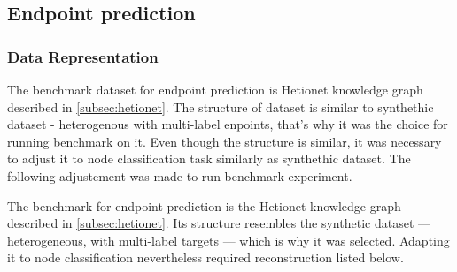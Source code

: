 \newpage %
\subsection{Endpoint prediction}
\label{subsec:benchmark-endpoint}

\subsubsection{Data Representation}

The benchmark dataset for endpoint prediction is Hetionet knowledge graph described in \cref{subsec:hetionet}.
The structure of dataset is similar to synthethic dataset - heterogenous with multi-label enpoints, that's 
why it was the choice for running benchmark on it. Even though the structure is similar, it was necessary
to adjust it to node classification task similarly as synthethic dataset. The following adjustement was made
to run benchmark experiment. 


The benchmark for endpoint prediction is the Hetionet knowledge graph described
in \cref{subsec:hetionet}. Its structure resembles the synthetic dataset ---
heterogeneous, with multi-label targets --- which is why it was selected.
Adapting it to node classification nevertheless required reconstruction listed below. 

